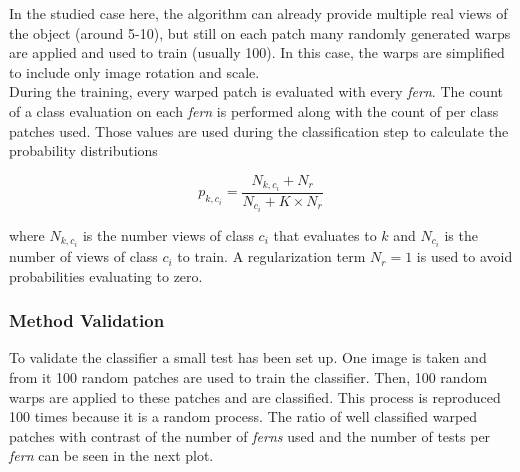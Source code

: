 In the studied case here, the algorithm can already provide multiple real views of the object (around 5-10), but still on each patch many randomly generated warps are applied and used to train (usually 100). In this case, the warps are simplified to include only image rotation and scale.\\

During the training, every warped patch is evaluated with every \textit{fern}. The count of a class evaluation on each \textit{fern} is performed along with the count of per class patches used. Those values are used during the classification step to calculate the probability distributions

\begin{equation}
  p_{k,c_i} = \frac{N_{k,c_i} + N_r}{N_{c_i} + K \times N_r}
\end{equation}

where $N_{k,c_i}$ is the number views of class $c_i$ that evaluates to $k$ and $N_{c_i}$ is the number of views of class $c_i$ to train. A regularization term $N_r = 1$ is used to avoid probabilities evaluating to zero.\\


\subsubsection{Method Validation}
\label{ssub:ferns_method_validation}

To validate the classifier a small test has been set up. One image is taken and from it 100 random patches are used to train the classifier. Then, 100 random warps are applied to these patches and are classified. This process is reproduced 100 times because it is a random process. The ratio of well classified warped patches with contrast of the number of \textit{ferns} used and the number of tests per \textit{fern} can be seen in the next plot.


